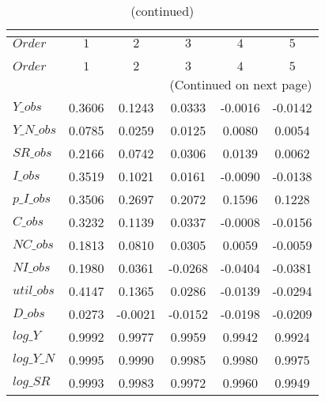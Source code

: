  
\begin{center}
\begin{longtable}{lccccc} 
\caption{COEFFICIENTS OF AUTOCORRELATION}\\
 \label{Table:th_autocorr_matrix}\\
\toprule 
$Order      $	 & 	 $         1$	 & 	 $         2$	 & 	 $         3$	 & 	 $         4$	 & 	 $         5$\\
\midrule \endfirsthead 
\caption{(continued)}\\
 \toprule \\ 
$Order      $	 & 	 $         1$	 & 	 $         2$	 & 	 $         3$	 & 	 $         4$	 & 	 $         5$\\
\midrule \endhead 
\midrule \multicolumn{6}{r}{(Continued on next page)} \\ \bottomrule \endfoot 
\bottomrule \endlastfoot 
$Y\_obs     $	 & 	    0.3606	 & 	    0.1243	 & 	    0.0333	 & 	   -0.0016	 & 	   -0.0142 \\ 
$Y\_N\_obs  $	 & 	    0.0785	 & 	    0.0259	 & 	    0.0125	 & 	    0.0080	 & 	    0.0054 \\ 
$SR\_obs    $	 & 	    0.2166	 & 	    0.0742	 & 	    0.0306	 & 	    0.0139	 & 	    0.0062 \\ 
$I\_obs     $	 & 	    0.3519	 & 	    0.1021	 & 	    0.0161	 & 	   -0.0090	 & 	   -0.0138 \\ 
$p\_I\_obs  $	 & 	    0.3506	 & 	    0.2697	 & 	    0.2072	 & 	    0.1596	 & 	    0.1228 \\ 
$C\_obs     $	 & 	    0.3232	 & 	    0.1139	 & 	    0.0337	 & 	   -0.0008	 & 	   -0.0156 \\ 
$NC\_obs    $	 & 	    0.1813	 & 	    0.0810	 & 	    0.0305	 & 	    0.0059	 & 	   -0.0059 \\ 
$NI\_obs    $	 & 	    0.1980	 & 	    0.0361	 & 	   -0.0268	 & 	   -0.0404	 & 	   -0.0381 \\ 
$util\_obs  $	 & 	    0.4147	 & 	    0.1365	 & 	    0.0286	 & 	   -0.0139	 & 	   -0.0294 \\ 
$D\_obs     $	 & 	    0.0273	 & 	   -0.0021	 & 	   -0.0152	 & 	   -0.0198	 & 	   -0.0209 \\ 
$log\_Y     $	 & 	    0.9992	 & 	    0.9977	 & 	    0.9959	 & 	    0.9942	 & 	    0.9924 \\ 
$log\_Y\_N  $	 & 	    0.9995	 & 	    0.9990	 & 	    0.9985	 & 	    0.9980	 & 	    0.9975 \\ 
$log\_SR    $	 & 	    0.9993	 & 	    0.9983	 & 	    0.9972	 & 	    0.9960	 & 	    0.9949 \\ 

\end{longtable}
\end{center}
